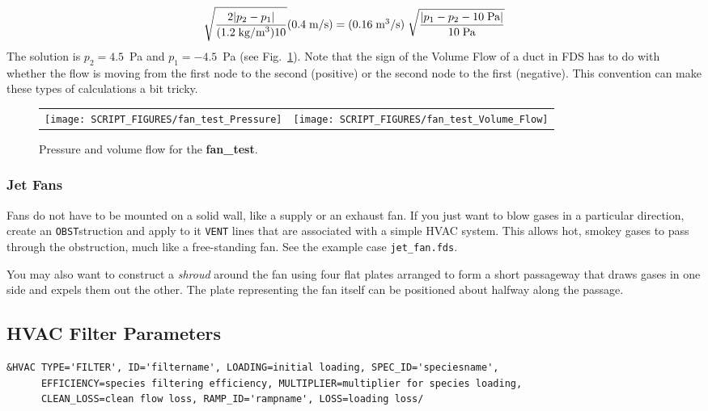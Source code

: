 \documentclass[11pt]{book}
\newcommand{\ct}{\tt\small}
\newcommand{\be}{\begin{equation}}
\newcommand{\ee}{\end{equation}}
\begin{document}
 \be  \sqrt{\frac {2 |p_2-p_1|}{ (1.2 \; \hbox{kg/m$^3$}) 10}} (0.4 \; \hbox{m/s}) =
   (0.16 \; \hbox{m$^3$/s})  \;
   \sqrt{ \frac{ |p_1-p_2-10 \; \hbox{Pa}|}{10 \; \hbox{Pa}}  } \ee
The solution is $p_2=4.5$~Pa and $p_1=-4.5$~Pa (see Fig.~\ref{fan_test}).
Note that the sign of the Volume Flow of a duct in FDS has to do with whether the flow is moving from the first node to the second (positive) or the second node to the first (negative).
This convention can make these types of calculations a bit tricky.

\begin{figure}[ht]
\begin{tabular*}{\textwidth}{lr}
\texttt{[image: SCRIPT\_FIGURES/fan\_test\_Pressure]} &
\texttt{[image: SCRIPT\_FIGURES/fan\_test\_Volume\_Flow]}
\end{tabular*}
\caption[Output of the {\bf fan\_test} example.]{Pressure and volume flow for the {\bf fan\_test}.}
\label{fan_test}
\end{figure}

\subsubsection{Jet Fans}

Fans do not have to be mounted on a solid wall, like a supply or an exhaust fan.
If you just want to blow gases in a particular direction, create an
{\ct OBST}struction and apply to it {\ct VENT} lines that are
associated with a simple HVAC system.
This allows hot, smokey gases to pass through the
obstruction, much like a free-standing fan.  See the example case {\ct jet\_fan.fds}.

You may also want to construct a {\em shroud} around the fan using four flat plates arranged to form
a short passageway that draws gases in one side and expels them out the other. The plate representing the
fan itself can be positioned about halfway along the passage.

\clearpage

\subsection{HVAC Filter Parameters}
\label{info:HVACfilter}
\footnotesize
\begin{verbatim}
&HVAC TYPE='FILTER', ID='filtername', LOADING=initial loading, SPEC_ID='speciesname',
      EFFICIENCY=species filtering efficiency, MULTIPLIER=multiplier for species loading,
      CLEAN_LOSS=clean flow loss, RAMP_ID='rampname', LOSS=loading loss/
\end{verbatim}\normalsize
\end{document}
